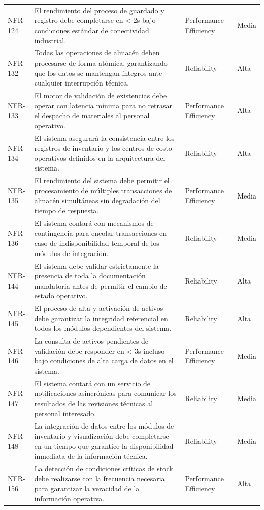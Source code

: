 \begin{longtable}{>{\raggedright\arraybackslash}p{} >{\raggedright\arraybackslash}p{} >{\raggedright\arraybackslash}p{} >{\raggedright\arraybackslash}p{}}
NFR-124 & El rendimiento del proceso de guardado y registro debe completarse en < 2s bajo condiciones estándar de conectividad industrial. & Performance Efficiency & Media \\
NFR-132 & Todas las operaciones de almacén deben procesarse de forma atómica, garantizando que los datos se mantengan íntegros ante cualquier interrupción técnica. & Reliability & Alta \\
NFR-133 & El motor de validación de existencias debe operar con latencia mínima para no retrasar el despacho de materiales al personal operativo. & Performance Efficiency & Alta \\
NFR-134 & El sistema asegurará la consistencia entre los registros de inventario y los centros de costo operativos definidos en la arquitectura del sistema. & Reliability & Alta \\
NFR-135 & El rendimiento del sistema debe permitir el procesamiento de múltiples transacciones de almacén simultáneas sin degradación del tiempo de respuesta. & Performance Efficiency & Media \\
NFR-136 & El sistema contará con mecanismos de contingencia para encolar transacciones en caso de indisponibilidad temporal de los módulos de integración. & Reliability & Media \\
NFR-144 & El sistema debe validar estrictamente la presencia de toda la documentación mandatoria antes de permitir el cambio de estado operativo. & Reliability & Alta \\
NFR-145 & El proceso de alta y activación de activos debe garantizar la integridad referencial en todos los módulos dependientes del sistema. & Reliability & Alta \\
NFR-146 & La consulta de activos pendientes de validación debe responder en < 3s incluso bajo condiciones de alta carga de datos en el sistema. & Performance Efficiency & Media \\
NFR-147 & El sistema contará con un servicio de notificaciones asincrónicas para comunicar los resultados de las revisiones técnicas al personal interesado. & Reliability & Media \\
NFR-148 & La integración de datos entre los módulos de inventario y visualización debe completarse en un tiempo que garantice la disponibilidad inmediata de la información técnica. & Reliability & Media \\
NFR-156 & La detección de condiciones críticas de stock debe realizarse con la frecuencia necesaria para garantizar la veracidad de la información operativa. & Performance Efficiency & Alta \\

\end{longtable}
